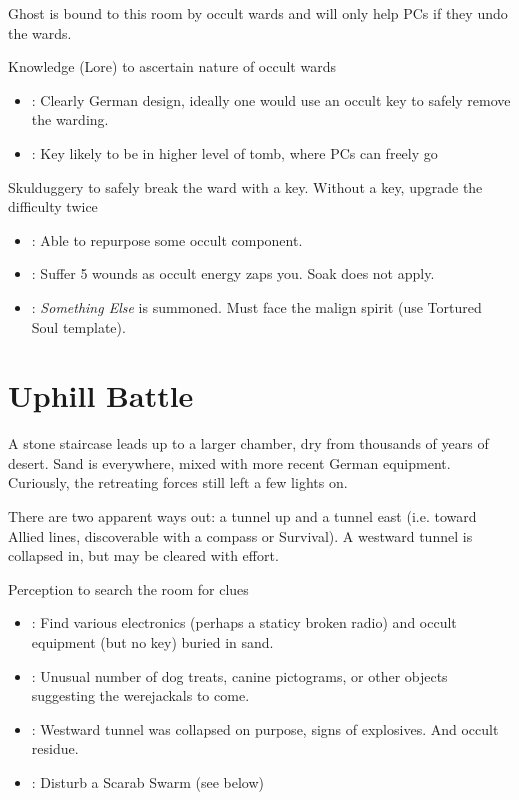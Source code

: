 \documentclass{book}
\newcommand{\df}{\DifficultyDie }
\newcommand{\stb}{\SetbackDie }
\begin{document}
\begin{multicols}{2}
Ghost is bound to this room by occult wards and will only help PCs if they undo the wards.

    \df\df Knowledge (Lore) to ascertain nature of occult wards
    \begin{itemize}
        \item \Success: Clearly German design, ideally one would use an occult key to safely remove the warding.
        \item \Advantage: Key likely to be in higher level of tomb, where PCs can freely go
    \end{itemize}

\df\df\stb\stb Skulduggery to safely break the ward with a key.  Without a key, upgrade the difficulty twice
    \begin{itemize}
        \item \Advantage: Able to repurpose some occult component.
        \item \Failure: Suffer 5 wounds as occult energy zaps you.  Soak does not apply.
        \item \Despair: \emph{Something Else} is summoned.  Must face the malign spirit (use Tortured Soul template).
    \end{itemize}

\section{Uphill Battle}

A stone staircase leads up to a larger chamber, dry from thousands of years of desert.  Sand is everywhere, mixed with more recent German equipment.  Curiously, the retreating forces still left a few lights on.

There are two apparent ways out: a tunnel up and a tunnel east (i.e. toward Allied lines, discoverable with a compass or Survival).  A westward tunnel is collapsed in, but may be cleared with effort.

\df\df\stb Perception to search the room for clues
    \begin{itemize}
        \item \Success: Find various electronics (perhaps a staticy broken radio) and occult equipment (but no key) buried in sand.
        \item \Advantage: Unusual number of dog treats, canine pictograms, or other objects suggesting the werejackals to come.
        \item \Advantage: Westward tunnel was collapsed on purpose, signs of explosives.  And occult residue.
        \item \Threat\Threat: Disturb a Scarab Swarm (see below)
    \end{itemize}


\end{multicols}
\end{document}
